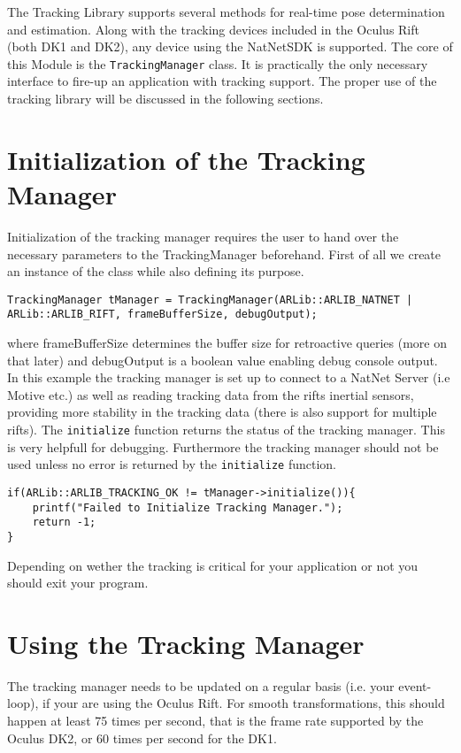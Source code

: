 The Tracking Library supports several methods for real-time pose determination and estimation. Along with the tracking devices included in the Oculus Rift (both DK1 and DK2), any device using the NatNetSDK is supported. The core of this Module is the \texttt{TrackingManager} class. It is practically the only necessary interface to fire-up an application with tracking support. The proper use of the tracking library will be discussed in the following sections.
\section{Initialization of the Tracking Manager}\label{tracking-manager-initialization}

Initialization of the tracking manager requires the user to hand over the necessary parameters to the TrackingManager beforehand. First of all we create an instance of the class while also defining its purpose.

\begin{lstlisting}
TrackingManager tManager = TrackingManager(ARLib::ARLIB_NATNET | ARLib::ARLIB_RIFT, frameBufferSize, debugOutput);
\end{lstlisting}
where frameBufferSize determines the buffer size for retroactive queries (more on that later) and debugOutput is a boolean value enabling debug console output. In this example the tracking manager is set up to connect to a NatNet Server (i.e Motive etc.) as well as reading tracking data from the rifts inertial sensors, providing more stability in the tracking data (there is also support for multiple rifts).
The \texttt{initialize} function returns the status of the tracking manager. This is very helpfull for debugging. Furthermore the tracking manager should not be used unless no error is returned by the \texttt{initialize} function.

\begin{lstlisting}
if(ARLib::ARLIB_TRACKING_OK != tManager->initialize()){
    printf("Failed to Initialize Tracking Manager.");
    return -1;
}
\end{lstlisting}
Depending on wether the tracking is critical for your application or not you should exit your program.

\section{Using the Tracking Manager}\label{using-the-tracking-manager}

The tracking manager needs to be updated on a regular basis (i.e. your event-loop), if your are using the Oculus Rift. For smooth transformations, this should happen at least 75 times per second, that is the frame rate supported by the Oculus DK2, or 60 times per second for the DK1.

